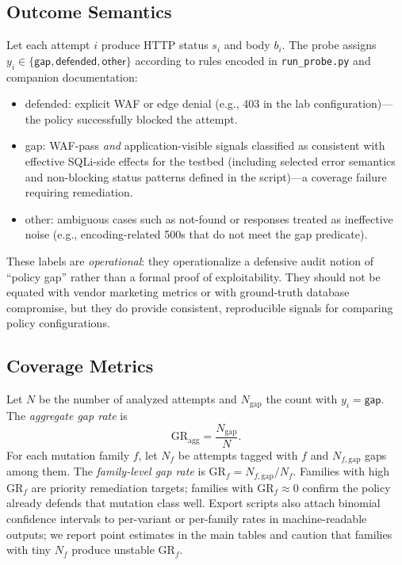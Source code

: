 \subsection{Outcome Semantics}
Let each attempt $i$ produce HTTP status $s_i$ and body $b_i$. The probe assigns $y_i \in \{\textsf{gap}, \textsf{defended}, \textsf{other}\}$ according to rules encoded in \texttt{run\_probe.py} and companion documentation:
\begin{itemize}
  \item \textsf{defended}: explicit WAF or edge denial (e.g., 403 in the lab configuration)---the policy successfully blocked the attempt.
  \item \textsf{gap}: WAF-pass \emph{and} application-visible signals classified as consistent with effective SQLi-side effects for the testbed (including selected error semantics and non-blocking status patterns defined in the script)---a coverage failure requiring remediation.
  \item \textsf{other}: ambiguous cases such as not-found or responses treated as ineffective noise (e.g., encoding-related 500s that do not meet the gap predicate).
\end{itemize}
These labels are \emph{operational}: they operationalize a defensive audit notion of ``policy gap'' rather than a formal proof of exploitability. They should not be equated with vendor marketing metrics or with ground-truth database compromise, but they do provide consistent, reproducible signals for comparing policy configurations.

\subsection{Coverage Metrics}
Let $N$ be the number of analyzed attempts and $N_{\mathrm{gap}}$ the count with $y_i=\textsf{gap}$. The \emph{aggregate gap rate} is
\begin{equation}
\label{eq:aggregate-gap-rate}
\mathrm{GR}_{\mathrm{agg}} = \frac{N_{\mathrm{gap}}}{N}.
\end{equation}
For each mutation family $f$, let $N_f$ be attempts tagged with $f$ and $N_{f,\mathrm{gap}}$ gaps among them. The \emph{family-level gap rate} is $\mathrm{GR}_f = N_{f,\mathrm{gap}}/N_f$. Families with high $\mathrm{GR}_f$ are priority remediation targets; families with $\mathrm{GR}_f \approx 0$ confirm the policy already defends that mutation class well. Export scripts also attach binomial confidence intervals to per-variant or per-family rates in machine-readable outputs; we report point estimates in the main tables and caution that families with tiny $N_f$ produce unstable $\mathrm{GR}_f$.

